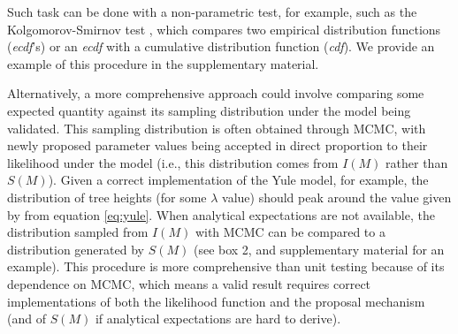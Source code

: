 \documentclass[oneside]{article}
\begin{document}
\begin{tcolorbox}[breakable, width=\textwidth, colback=gray!10, boxrule=0pt,
  title=Box 2: Additional validation sanity-checks, fonttitle=\bfseries]
  \vspace{.15cm}
  Such task can be done with a non-parametric test, for example, such
  as the Kolgomorov-Smirnov test \citep{kolgomorov,smirnov,ks}, which
  compares two empirical distribution functions (\emph{ecdf}'s) or an
  \emph{ecdf} with a cumulative distribution function (\emph{cdf}).
  We provide an example of this procedure in the supplementary material.
\end{tcolorbox}

Alternatively, a more comprehensive approach could involve comparing
some expected quantity against its sampling distribution under the
model being validated.
This sampling distribution is often obtained through MCMC, with
newly proposed parameter values being accepted in direct proportion to
their likelihood under the model (i.e., this distribution comes from
$I(M)$ rather than $S(M)$).
Given a correct implementation of the Yule model, for example, the
distribution of tree heights (for some $\lambda$ value) should peak around the
value given by from equation \ref{eq:yule}.
When analytical expectations are not available, the distribution
sampled from $I(M)$ with MCMC can be compared to a distribution
generated by $S(M)$ (see box 2, and supplementary material for an example).
This procedure is more comprehensive than unit testing because of its
dependence on MCMC, which means a valid result requires correct
implementations of both the likelihood function and the proposal
mechanism (and of $S(M)$ if analytical expectations are hard to derive).



\end{document}
